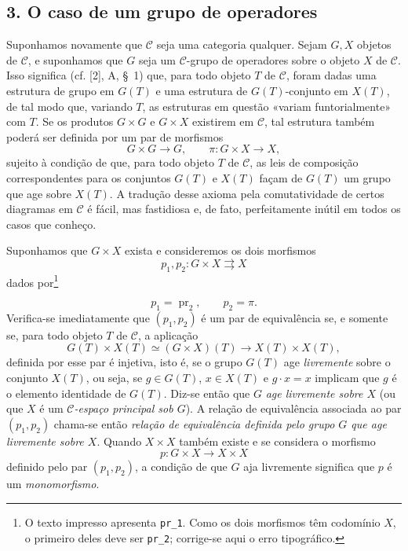 \documentclass[11pt,twoside,openany]{book}
\numberwithin{equation}{section}
\newcommand{\src}[1]{%
  \phantomsection\hypertarget{src:#1}{}%
  \marginpar{\raggedleft\footnotesize\sffamily #1}%
}
\theoremstyle{plain}
\theoremstyle{definition}
\theoremstyle{remark}
\newcommand{\FgaUnitKey}{frontmatter}
\renewcommand{\src}[1]{%
  \phantomsection\hypertarget{src:\FgaUnitKey:#1}{}%
  \marginpar{\raggedleft\footnotesize\sffamily #1}%
}
\begin{document}
\subsection*{3. O caso de um grupo de operadores}

Suponhamos novamente que $\mathcal C$ seja uma categoria qualquer. Sejam
$G,X$ objetos de $\mathcal C$, e suponhamos que $G$ seja um
$\mathcal C$-grupo de operadores sobre o objeto $X$ de $\mathcal C$. Isso
significa (cf. [2], A, \S~1) que, para todo objeto $T$ de $\mathcal C$, foram
dadas uma estrutura de grupo em $G(T)$ e uma estrutura de $G(T)$-conjunto em
$X(T)$, de tal modo que, variando $T$, as estruturas em questão «variam
funtorialmente» com $T$. Se os produtos $G\times G$ e $G\times X$ existirem
em $\mathcal C$, tal estrutura também poderá ser definida por um par de
morfismos
\[
  G\times G\longrightarrow G,
  \qquad \pi:G\times X\longrightarrow X,
\]
sujeito à condição de que, para todo objeto $T$ de $\mathcal C$, as leis de
composição correspondentes para os conjuntos $G(T)$ e $X(T)$ façam de $G(T)$
um grupo que age sobre $X(T)$. A tradução desse axioma pela comutatividade de
certos diagramas em $\mathcal C$ é fácil, mas fastidiosa e, de fato,
perfeitamente inútil em todos os casos que conheço.

Suponhamos que $G\times X$ exista e consideremos os dois morfismos
\[
  p_1,p_2:G\times X\rightrightarrows X
\]
dados por\footnote{O texto impresso apresenta \texttt{pr\_1}. Como os dois
morfismos têm codomínio $X$, o primeiro deles deve ser
\texttt{pr\_2}; corrige-se aqui o erro tipográfico.}
\src{105}
\[
  p_1=\operatorname{pr}_2,\qquad p_2=\pi.
\]
Verifica-se imediatamente que $(p_1,p_2)$ é um par de equivalência se, e
somente se, para todo objeto $T$ de $\mathcal C$, a aplicação
\[
  G(T)\times X(T)\simeq(G\times X)(T)
  \longrightarrow X(T)\times X(T),
\]
definida por esse par é injetiva, isto é, se o grupo $G(T)$ age
\emph{livremente} sobre o conjunto $X(T)$, ou seja, se $g\in G(T)$,
$x\in X(T)$ e $g\cdot x=x$ implicam que $g$ é o elemento identidade de
$G(T)$. Diz-se então que $G$ \emph{age livremente sobre $X$} (ou que $X$ é um
\emph{$\mathcal C$-espaço principal sob $G$}). A relação de equivalência
associada ao par $(p_1,p_2)$ chama-se então \emph{relação de equivalência
definida pelo grupo $G$ que age livremente sobre $X$}. Quando $X\times X$
também existe e se considera o morfismo
\[
  p:G\times X\longrightarrow X\times X
\]
definido pelo par $(p_1,p_2)$, a condição de que $G$ aja livremente significa
que $p$ é um \emph{monomorfismo}.
\end{document}
